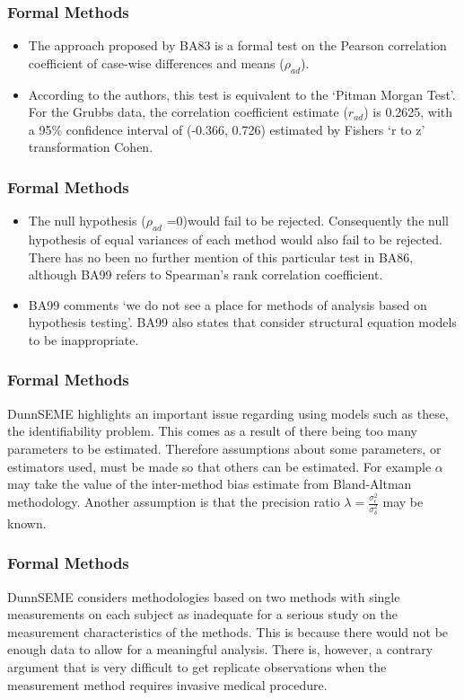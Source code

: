\documentclass[compress]{beamer}        %
\begin{document}
\begin{frame}
\frametitle{Formal Methods}
\begin{itemize}
\item The approach proposed by \alert{BA83} is a formal test on the
Pearson correlation coefficient of case-wise differences and means
($\rho_{ad}$).
\item According to the authors, this test is equivalent
to the `Pitman Morgan Test'. For the Grubbs data, the correlation
coefficient estimate ($r_{ad}$) is 0.2625, with a 95\% confidence
interval of (-0.366, 0.726) estimated by Fishers `r to z'
transformation \alert{Cohen}.
\end{itemize}
 
\end{frame}
\begin{frame}
\frametitle{Formal Methods}
\begin{itemize}
\item The null hypothesis ($\rho_{ad}$
=0)would fail to be rejected. Consequently the null hypothesis of
equal variances of each method would also fail to be rejected.
There has no been no further mention of this particular test in
\alert{BA86}, although \alert{BA99} refers to Spearman's rank
correlation coefficient. 
\item \alert{BA99} comments `we do not see a
place for methods of analysis based on hypothesis testing'.
\alert{BA99} also states that consider structural equation models
to be inappropriate.
\end{itemize}
 
\end{frame}
\begin{frame}
\frametitle{Formal Methods}
\alert{DunnSEME} highlights an important issue regarding using
models such as these, the identifiability problem. This comes as a
result of there being too many parameters to be estimated.
Therefore assumptions about some parameters, or estimators used,
must be made so that others can be estimated. For example $\alpha$
may take the value of the inter-method bias estimate from
Bland-Altman methodology. Another assumption is that the precision
ratio $\lambda=\frac{\sigma^{2}_{\epsilon}}{\sigma^{2}_{\delta}}$
may be known.
\end{frame}
\begin{frame}
\frametitle{Formal Methods}
\alert{DunnSEME} considers methodologies based on two methods with single measurements on each subject as inadequate for a serious study
on the measurement characteristics of the methods. This is because there would not be enough data to allow for a meaningful analysis.
There is, however, a contrary argument that is very difficult to get replicate
observations when the measurement method requires invasive medical procedure.
\end{frame}
\end{document}
